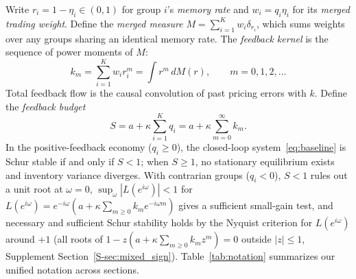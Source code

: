 \documentclass[11pt,letterpaper]{article}
\theoremstyle{definition}
\begin{document}
Write $r_i = 1 - \eta_i \in (0, 1)$ for group $i$'s \emph{memory rate} and $w_i = q_i \eta_i$ for its \emph{merged trading weight}. Define the \emph{merged measure} $M = \sum_{i=1}^K w_i \delta_{r_i}$, which sums weights over any groups sharing an identical memory rate. The \emph{feedback kernel} is the sequence of power moments of $M$:
\begin{equation}\label{eq:kernel}
  k_m = \sum_{i=1}^K w_i r_i^m = \int r^m \, dM(r), \qquad m = 0, 1, 2, \dots
\end{equation}
Total feedback flow is the causal convolution of past pricing errors with $k$. Define the \emph{feedback budget}
\begin{equation}\label{eq:budget}
  S = a + \kappa \sum_{i=1}^K q_i = a + \kappa \sum_{m=0}^\infty k_m.
\end{equation}
In the positive-feedback economy ($q_i \ge 0$), the closed-loop system~\eqref{eq:baseline} is Schur stable if and only if $S < 1$; when $S \ge 1$, no stationary equilibrium exists and inventory variance diverges. With contrarian groups ($q_i < 0$), $S < 1$ rules out a unit root at $\omega = 0$, $\sup_\omega |L(e^{i\omega})| < 1$ for $L(e^{i\omega}) = e^{-i\omega}(a + \kappa \sum_{m \ge 0} k_m e^{-i\omega m})$ gives a sufficient small-gain test, and necessary and sufficient Schur stability holds by the Nyquist criterion for $L(e^{i\omega})$ around $+1$ (all roots of $1 - z(a + \kappa \sum_{m\ge 0} k_m z^m) = 0$ outside $|z| \le 1$, Supplement Section~\ref{S-sec:mixed_sign}). Table~\ref{tab:notation} summarizes our unified notation across sections.
\end{document}
